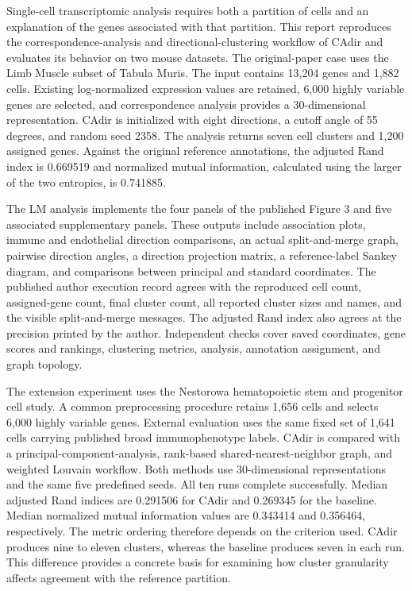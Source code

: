 Single-cell transcriptomic analysis requires both a partition of cells and an explanation of the genes associated with that partition. This report reproduces the correspondence-analysis and directional-clustering workflow of CAdir and evaluates its behavior on two mouse datasets. The original-paper case uses the Limb Muscle subset of Tabula Muris. The input contains 13,204 genes and 1,882 cells. Existing log-normalized expression values are retained, 6,000 highly variable genes are selected, and correspondence analysis provides a 30-dimensional representation. CAdir is initialized with eight directions, a cutoff angle of 55 degrees, and random seed 2358. The analysis returns seven cell clusters and 1,200 assigned genes. Against the original reference annotations, the adjusted Rand index is 0.669519 and normalized mutual information, calculated using the larger of the two entropies, is 0.741885.

The LM analysis implements the four panels of the published Figure 3 and five associated supplementary panels. These outputs include association plots, immune and endothelial direction comparisons, an actual split-and-merge graph, pairwise direction angles, a direction projection matrix, a reference-label Sankey diagram, and comparisons between principal and standard coordinates. The published author execution record agrees with the reproduced cell count, assigned-gene count, final cluster count, all reported cluster sizes and names, and the visible split-and-merge messages. The adjusted Rand index also agrees at the precision printed by the author. Independent checks cover saved coordinates, gene scores and rankings, clustering metrics,  analysis, annotation assignment, and graph topology.

The extension experiment uses the Nestorowa hematopoietic stem and progenitor cell study. A common preprocessing procedure retains 1,656 cells and selects 6,000 highly variable genes. External evaluation uses the same fixed set of 1,641 cells carrying published broad immunophenotype labels. CAdir is compared with a principal-component-analysis, rank-based shared-nearest-neighbor graph, and weighted Louvain workflow. Both methods use 30-dimensional representations and the same five predefined seeds. All ten runs complete successfully. Median adjusted Rand indices are 0.291506 for CAdir and 0.269345 for the baseline. Median normalized mutual information values are 0.343414 and 0.356464, respectively. The metric ordering therefore depends on the criterion used. CAdir produces nine to eleven clusters, whereas the baseline produces seven in each run. This difference provides a concrete basis for examining how cluster granularity affects agreement with the reference partition.

